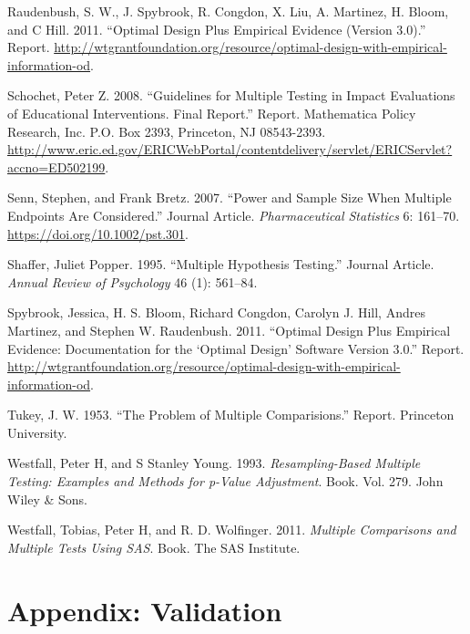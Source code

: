 \documentclass[
]{article}
\newlength{\cslhangindent}
\newlength{\cslentryspacingunit} %
\newenvironment{CSLReferences}[2] %
 {%
  \setlength{\parindent}{0pt}
  \ifodd #1
  \let\oldpar\par
  \def\par{\hangindent=\cslhangindent\oldpar}
  \fi
  \setlength{\parskip}{#2\cslentryspacingunit}
 }%
 {}
\begin{document}
\begin{CSLReferences}{1}{0}
\leavevmode{}%
Raudenbush, S. W., J. Spybrook, R. Congdon, X. Liu, A. Martinez, H.
Bloom, and C Hill. 2011. {``Optimal Design Plus Empirical Evidence
(Version 3.0).''} Report.
\url{http://wtgrantfoundation.org/resource/optimal-design-with-empirical-information-od}.

\leavevmode{}%
Schochet, Peter Z. 2008. {``Guidelines for Multiple Testing in Impact
Evaluations of Educational Interventions. Final Report.''} Report.
Mathematica Policy Research, Inc. P.O. Box 2393, Princeton, NJ
08543-2393.
\url{http://www.eric.ed.gov/ERICWebPortal/contentdelivery/servlet/ERICServlet?accno=ED502199}.

\leavevmode{}%
Senn, Stephen, and Frank Bretz. 2007. {``Power and Sample Size When
Multiple Endpoints Are Considered.''} Journal Article.
\emph{Pharmaceutical Statistics} 6: 161--70.
\url{https://doi.org/10.1002/pst.301}.

\leavevmode{}%
Shaffer, Juliet Popper. 1995. {``Multiple Hypothesis Testing.''} Journal
Article. \emph{Annual Review of Psychology} 46 (1): 561--84.

\leavevmode{}%
Spybrook, Jessica, H. S. Bloom, Richard Congdon, Carolyn J. Hill, Andres
Martinez, and Stephen W. Raudenbush. 2011. {``Optimal Design Plus
Empirical Evidence: Documentation for the {`Optimal Design'} Software
Version 3.0.''} Report.
\url{http://wtgrantfoundation.org/resource/optimal-design-with-empirical-information-od}.

\leavevmode{}%
Tukey, J. W. 1953. {``The Problem of Multiple Comparisions.''} Report.
Princeton University.

\leavevmode{}%
Westfall, Peter H, and S Stanley Young. 1993. \emph{Resampling-Based
Multiple Testing: Examples and Methods for p-Value Adjustment}. Book.
Vol. 279. John Wiley \& Sons.

\leavevmode{}%
Westfall, Tobias, Peter H, and R. D. Wolfinger. 2011. \emph{Multiple
Comparisons and Multiple Tests Using SAS}. Book. The SAS Institute.

\end{CSLReferences}

\section{Appendix: Validation}
\end{document}
